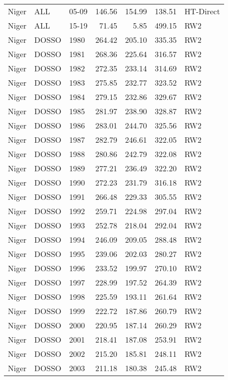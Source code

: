 \begin{longtable}{lllrrrl}
  Niger & ALL & 05-09 & 146.56 & 154.99 & 138.51 & HT-Direct \\ 
  Niger & ALL & 15-19 & 71.45 & 5.85 & 499.15 & RW2 \\ 
  Niger & DOSSO & 1980 & 264.42 & 205.10 & 335.35 & RW2 \\ 
  Niger & DOSSO & 1981 & 268.36 & 225.64 & 316.57 & RW2 \\ 
  Niger & DOSSO & 1982 & 272.35 & 233.14 & 314.69 & RW2 \\ 
  Niger & DOSSO & 1983 & 275.85 & 232.77 & 323.52 & RW2 \\ 
  Niger & DOSSO & 1984 & 279.15 & 232.86 & 329.67 & RW2 \\ 
  Niger & DOSSO & 1985 & 281.97 & 238.90 & 328.87 & RW2 \\ 
  Niger & DOSSO & 1986 & 283.01 & 244.70 & 325.56 & RW2 \\ 
  Niger & DOSSO & 1987 & 282.79 & 246.61 & 322.05 & RW2 \\ 
  Niger & DOSSO & 1988 & 280.86 & 242.79 & 322.08 & RW2 \\ 
  Niger & DOSSO & 1989 & 277.21 & 236.49 & 322.20 & RW2 \\ 
  Niger & DOSSO & 1990 & 272.23 & 231.79 & 316.18 & RW2 \\ 
  Niger & DOSSO & 1991 & 266.48 & 229.33 & 305.55 & RW2 \\ 
  Niger & DOSSO & 1992 & 259.71 & 224.98 & 297.04 & RW2 \\ 
  Niger & DOSSO & 1993 & 252.78 & 218.04 & 292.04 & RW2 \\ 
  Niger & DOSSO & 1994 & 246.09 & 209.05 & 288.48 & RW2 \\ 
  Niger & DOSSO & 1995 & 239.06 & 202.03 & 280.27 & RW2 \\ 
  Niger & DOSSO & 1996 & 233.52 & 199.97 & 270.10 & RW2 \\ 
  Niger & DOSSO & 1997 & 228.99 & 197.52 & 264.39 & RW2 \\ 
  Niger & DOSSO & 1998 & 225.59 & 193.11 & 261.64 & RW2 \\ 
  Niger & DOSSO & 1999 & 222.72 & 187.86 & 260.79 & RW2 \\ 
  Niger & DOSSO & 2000 & 220.95 & 187.14 & 260.29 & RW2 \\ 
  Niger & DOSSO & 2001 & 218.41 & 187.08 & 253.91 & RW2 \\ 
  Niger & DOSSO & 2002 & 215.20 & 185.81 & 248.11 & RW2 \\ 
  Niger & DOSSO & 2003 & 211.18 & 180.38 & 245.48 & RW2 \\ 

\end{longtable}
